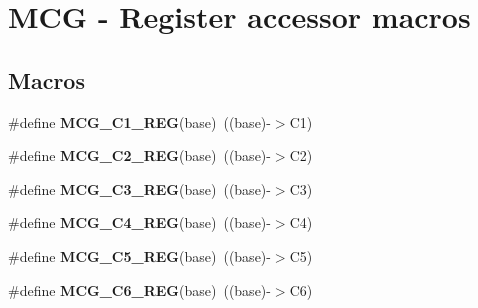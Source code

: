 \hypertarget{group___m_c_g___register___accessor___macros}{}\section{M\+CG -\/ Register accessor macros}
\label{group___m_c_g___register___accessor___macros}
\subsection*{Macros}
\begin{DoxyCompactItemize}
\item 
\mbox{\label{group___m_c_g___register___accessor___macros_ga8bae88afeec8abab181383a6e5a9fecb}} 
\#define {\bfseries M\+C\+G\+\_\+\+C1\+\_\+\+R\+EG}(base)~((base)-\/$>$C1)
\item 
\mbox{\label{group___m_c_g___register___accessor___macros_ga1fe49262912ac579f147ae5c2cfde5a5}} 
\#define {\bfseries M\+C\+G\+\_\+\+C2\+\_\+\+R\+EG}(base)~((base)-\/$>$C2)
\item 
\mbox{\label{group___m_c_g___register___accessor___macros_ga7ead9604d56b0f9d04a297a8ddad2bfd}} 
\#define {\bfseries M\+C\+G\+\_\+\+C3\+\_\+\+R\+EG}(base)~((base)-\/$>$C3)
\item 
\mbox{\label{group___m_c_g___register___accessor___macros_ga7ecd15c7ea67a8febfe9fb84044905c8}} 
\#define {\bfseries M\+C\+G\+\_\+\+C4\+\_\+\+R\+EG}(base)~((base)-\/$>$C4)
\item 
\mbox{\label{group___m_c_g___register___accessor___macros_ga8d61340716746b32bbf9dc08f45bd8f6}} 
\#define {\bfseries M\+C\+G\+\_\+\+C5\+\_\+\+R\+EG}(base)~((base)-\/$>$C5)
\item 
\mbox{\label{group___m_c_g___register___accessor___macros_ga900a3edcbbfc2933afe2a26c6774fd69}} 
\#define {\bfseries M\+C\+G\+\_\+\+C6\+\_\+\+R\+EG}(base)~((base)-\/$>$C6)
\item 
\mbox{\label{group___m_c_g___register___accessor___macros_gac8e21014738ce19fa716fe2ee80f1a64}} 

\end{DoxyCompactItemize}
